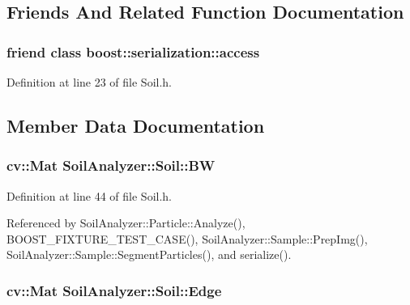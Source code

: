 \subsection{Friends And Related Function Documentation}
\hypertarget{class_soil_analyzer_1_1_soil_ac98d07dd8f7b70e16ccb9a01abf56b9c}{}
\subsubsection[{boost\+::serialization\+::access}]{\setlength{\rightskip}{0pt plus 5cm}friend class boost\+::serialization\+::access\hspace{0.3cm}{\ttfamily [friend]}}\label{class_soil_analyzer_1_1_soil_ac98d07dd8f7b70e16ccb9a01abf56b9c}


Definition at line 23 of file Soil.\+h.



\subsection{Member Data Documentation}
\hypertarget{class_soil_analyzer_1_1_soil_ae11b578192ebae3165f75c09d6116f74}{}
\subsubsection[{B\+W}]{\setlength{\rightskip}{0pt plus 5cm}cv\+::\+Mat Soil\+Analyzer\+::\+Soil\+::\+B\+W}\label{class_soil_analyzer_1_1_soil_ae11b578192ebae3165f75c09d6116f74}


Definition at line 44 of file Soil.\+h.



Referenced by Soil\+Analyzer\+::\+Particle\+::\+Analyze(), B\+O\+O\+S\+T\+\_\+\+F\+I\+X\+T\+U\+R\+E\+\_\+\+T\+E\+S\+T\+\_\+\+C\+A\+S\+E(), Soil\+Analyzer\+::\+Sample\+::\+Prep\+Img(), Soil\+Analyzer\+::\+Sample\+::\+Segment\+Particles(), and serialize().

\hypertarget{class_soil_analyzer_1_1_soil_ab867a74ecebcd5a3d84e2f9ea806b874}{}
\subsubsection[{Edge}]{\setlength{\rightskip}{0pt plus 5cm}cv\+::\+Mat Soil\+Analyzer\+::\+Soil\+::\+Edge}\label{class_soil_analyzer_1_1_soil_ab867a74ecebcd5a3d84e2f9ea806b874}


